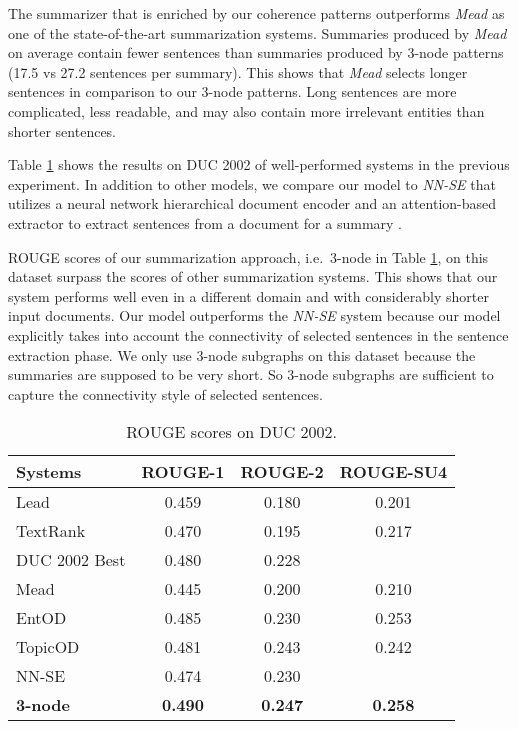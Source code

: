 The summarizer that is enriched by our coherence patterns outperforms \emph{Mead} as one of the state-of-the-art summarization systems. 
Summaries produced by \emph{Mead} on average contain fewer sentences than summaries produced by 3-node patterns (17.5 vs 27.2 sentences per summary).
This shows that \emph{Mead} selects longer sentences in comparison to our 3-node patterns.  
Long sentences are more complicated, less readable, and may also contain more irrelevant entities than shorter sentences. 

Table \ref{tab:summary-duc} shows the results on DUC 2002 of well-performed  systems in the previous experiment. 
In addition to other models, we compare our model to \emph{NN-SE} that utilizes a neural network hierarchical document encoder and an \mbox{attention-based} extractor to extract sentences from a document for a summary \cite{chengjianpeng16}.

ROUGE scores of our summarization approach, i.e.\ 3-node in Table \ref{tab:summary-duc}, on this dataset surpass the scores of other summarization systems. 
This shows that our system performs well even in a different domain and with considerably shorter input documents. 
Our model outperforms the \emph{NN-SE} system because our model explicitly takes into account the connectivity of selected sentences in the sentence extraction phase. 
We only use 3-node subgraphs on this dataset because the summaries are supposed to be very short. 
So 3-node subgraphs are sufficient to capture the connectivity style of selected sentences. 


\begin{table}[!ht]
	\begin{center}
		\begin{tabular}{lccc}
			\toprule
			\textbf{Systems} 					& \textbf{ROUGE-1} 	& \textbf{ROUGE-2} 	& \textbf{ROUGE-SU4} \\
			\midrule
			Lead 						& 0.459 & 0.180 & 0.201	\\
			TextRank 					& 0.470 & 0.195 & 0.217	\\
			DUC 2002 Best 				& 0.480 & 0.228 & 		\\
			Mead 						& 0.445 & 0.200 & 0.210	\\
			EntOD						& 0.485 & 0.230 & 0.253 \\
			TopicOD 					& 0.481 & 0.243 & 0.242 \\
			NN-SE 						& 0.474 & 0.230 & 		\\
			\textbf{3-node} 						& \textbf{0.490} & \textbf{0.247} & \textbf{0.258}\\
			\bottomrule
		\end{tabular}
	\end{center}
	\caption{ROUGE scores on DUC 2002.}
	\label{tab:summary-duc}
\end{table}

